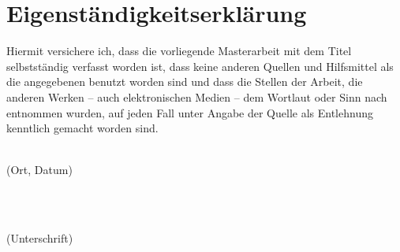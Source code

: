 %
\chapter*{Eigenständigkeitserklärung}
\label{sec:declaration}

Hiermit versichere ich, dass die vorliegende Masterarbeit mit dem Titel \textit{\thesisTitle} selbstständig verfasst worden ist, dass keine anderen Quellen und Hilfsmittel als die angegebenen benutzt worden sind und dass die Stellen der Arbeit, die anderen Werken -- auch elektronischen Medien -- dem Wortlaut oder Sinn nach entnommen wurden, auf jeden Fall unter Angabe der Quelle als Entlehnung kenntlich gemacht worden sind.

\vspace*{2cm}

\begin{minipage}{0.5\textwidth}
	\begin{flushleft} \large
		\underline{\hspace{6cm}} \\
		{\footnotesize (Ort, Datum)}
	\end{flushleft}
\end{minipage}
~
\begin{minipage}{0.5\textwidth}
	\begin{flushright} \large
		\underline{\hspace{6cm}} \\
		{\footnotesize (Unterschrift)}
	\end{flushright}
\end{minipage}\\[0.5cm]

